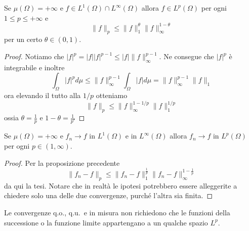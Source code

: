 \begin{proposition}
    Se \(\mu{(\Omega)} = +\infty\) e \(f \in L^{1}{(\Omega)} \cap
    L^{\infty}{(\Omega)}\) allora \(f \in L^{p}{(\Omega)}\) per ogni \(1 \le p
    \le +\infty\) e
    \[
        \|f\|_p \le \|f\|_1^{\theta} \|f\|_{\infty}^{1-\theta} 
    \]
    per un certo \(\theta \in {(0,1)}\).
\end{proposition}
\begin{proof}
    Notiamo che \(|f|^{p} = |f||f|^{p-1} \le |f| \|f\|_\infty^{p-1}\). Ne
    consegue che \(|f|^{p }\) è integrabile e inoltre
    \[
        \int_\Omega |f|^{p} d\mu \le \|f\|_\infty^{p-1} \int_\Omega |f| d\mu =
        \|f\|_\infty^{p-1} \|f\|_1
    \]
    ora elevando il tutto alla \(1/p\) otteniamo
    \[
        \|f\|_p \le \|f\|_\infty^{1-1/p} \|f\|_1^{1/p}
    \]
    ossia \(\displaystyle \theta = \frac{1}{p}\) e \(\displaystyle 1 - \theta = \frac{1}{p'}\) 
\end{proof}
\begin{corollary}
    Se \(\mu{(\Omega)} = +\infty\) e \(f_{n} \to f\) in \(L^{1}{(\Omega)}\) e
    in \(L^{\infty}{(\Omega)}\) allora \(f_{n} \to f\) in \(L^{p}{(\Omega)}\)
    per ogni \(p \in (1, \infty)\).
\end{corollary}
\begin{proof}
    Per la proposizione precedente
    \[
        \|f_{n} -f\|_p \le  \|f_{n} - f\|_1^{\frac{1}{p}} \|f_{n} -
        f\|_{\infty}^{1-\frac{1}{p}}
    \]
    da qui la tesi. Notare che in realtà le ipotesi potrebbero essere
    alleggerite a chiedere solo una delle due convergenze, purché l'altra sia
    finita.
\end{proof}
\begin{note}
    Le convergenze q.o., q.u.~e in misura non richiedono che le funzioni della
    successione o la funzione limite appartengano a un qualche spazio \(L^{p}\).
\end{note}


